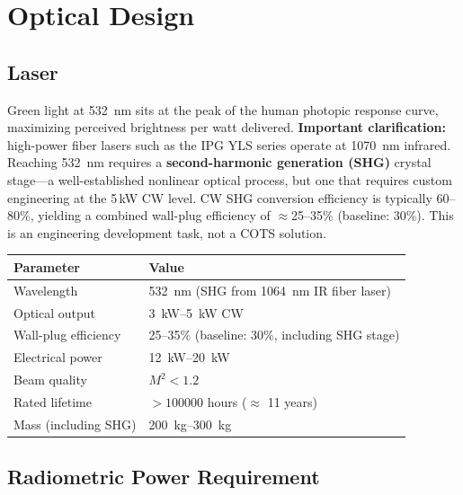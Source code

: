 \documentclass[12pt,letterpaper]{article}
\begin{document}
\section{Optical Design}

\subsection{Laser}

Green light at \SI{532}{\nano\meter} sits at the peak of the human photopic
response curve, maximizing perceived brightness per watt delivered.
\textbf{Important clarification:} high-power fiber lasers such as the IPG YLS
series operate at \SI{1070}{\nano\meter} infrared. Reaching \SI{532}{\nano\meter}
requires a \textbf{second-harmonic generation (SHG)} crystal stage---a well-established
nonlinear optical process, but one that requires custom engineering at the 5\,kW CW level.
CW SHG conversion efficiency is typically 60--80\%, yielding a combined wall-plug efficiency
of $\approx$25--35\% (baseline: 30\%). This is an engineering development task, not a COTS
solution.

\begin{center}
\begin{tabular}{ll}
\toprule
\textbf{Parameter} & \textbf{Value} \\
\midrule
Wavelength & \SI{532}{\nano\meter} (SHG from \SI{1064}{\nano\meter} IR fiber laser) \\
Optical output & \SI{3}{\kilo\watt}--\SI{5}{\kilo\watt} CW \\
Wall-plug efficiency & 25--35\% (baseline: 30\%, including SHG stage) \\
Electrical power & \SI{12}{\kilo\watt}--\SI{20}{\kilo\watt} \\
Beam quality & $M^2 < 1.2$ \\
Rated lifetime & $> \num{100000}$ hours ($\approx$ 11 years) \\
Mass (including SHG) & \SI{200}{\kilo\gram}--\SI{300}{\kilo\gram} \\
\bottomrule
\end{tabular}
\end{center}

\subsection{Radiometric Power Requirement}
\end{document}
